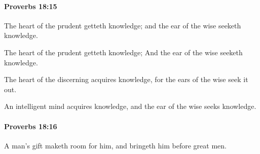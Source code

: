 		\paragraph{Proverbs 18:15} %
			\label{PROVERBS-18-15}

			The heart of the prudent getteth knowledge; and the ear of the wise seeketh knowledge.

			\begin{versebox}
					\item[BHS] 
					\item[ASV] The heart of the prudent getteth knowledge; And the ear of the wise seeketh knowledge.
					\item[NIV] The heart of the discerning acquires knowledge, for the ears of the wise seek it out.
					\item[NRSV] An intelligent mind acquires knowledge, and the ear of the wise seeks knowledge.
			\end{versebox}

		\paragraph{Proverbs 18:16} %
			\label{PROVERBS-18-16}

			A man’s gift maketh room for him, and bringeth him before great men.

